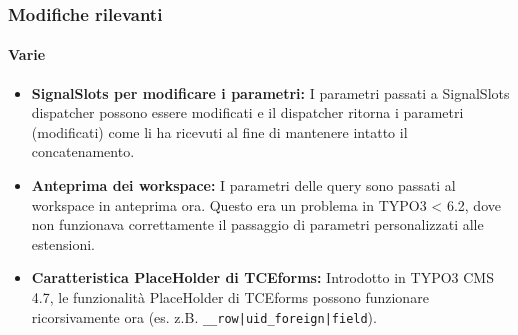 \begin{frame}[fragile]
	\frametitle{Modifiche rilevanti}
	\framesubtitle{Varie}

	\begin{itemize}

		\item \textbf{SignalSlots per modificare i parametri:}\newline
			\small
				I parametri passati a SignalSlots dispatcher possono essere modificati e il dispatcher ritorna i parametri (modificati) come li ha ricevuti al fine di mantenere intatto il concatenamento.
			\normalsize

		\item \textbf{Anteprima dei workspace:}\newline
			\small
				I parametri delle query sono passati al workspace in anteprima ora. Questo era un problema in TYPO3 < 6.2, dove non funzionava correttamente il passaggio di parametri personalizzati alle estensioni.
			\normalsize

		\item \textbf{Caratteristica PlaceHolder di TCEforms:}\newline
			\small
				Introdotto in TYPO3 CMS 4.7, le funzionalità PlaceHolder di TCEforms possono funzionare ricorsivamente ora (es. z.B. \texttt{\_\_row|uid\_foreign|field}).
			\normalsize

	\end{itemize}
	
\end{frame}


